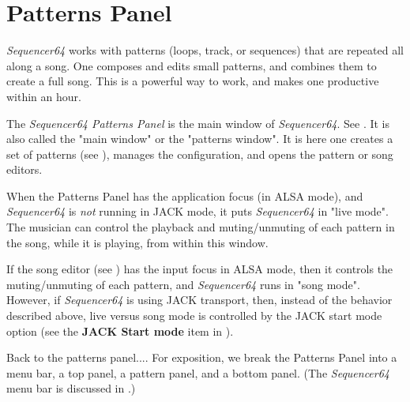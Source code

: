 %
%
%

\section{Patterns Panel}
\label{sec:seq64_patterns_panel}

   \textsl{Sequencer64} works with patterns (loops, track, or
   sequences) that are repeated all along a song.  One composes and edits small
   patterns, and combines them to create a full song.  This is a powerful way
   to work, and makes one productive within an hour.

   The \textsl{Sequencer64 Patterns Panel} is the main window of
   \textsl{Sequencer64}.
   See .
   It is also called the "main window" or the "patterns window".
   It is here one creates a set of patterns
   (see ),
   manages the configuration, and opens the pattern or song editors.

   When the Patterns Panel has the application focus (in ALSA mode),
   and \textsl{Sequencer64}
   is \textsl{not} running in JACK mode, it puts
   \textsl{Sequencer64} in "live mode".  The musician can
   control the playback and muting/unmuting of each pattern in
   the song, while it is playing, from within this window.

   If the song editor
   (see )
   has the input focus in ALSA mode, then it controls the muting/unmuting of
   each pattern, and \textsl{Sequencer64} runs in "song mode".
   However, if \textsl{Sequencer64} is using JACK transport, then, instead of
   the behavior described above, live versus song mode is controlled by the
   JACK start mode option (see the \textbf{JACK Start mode} item in
   ).

   Back to the patterns panel....  For exposition, we break the Patterns Panel
   into a menu bar, a top panel, a pattern panel, and a bottom panel.
   (The \textsl{Sequencer64} menu bar is discussed in
   .)

